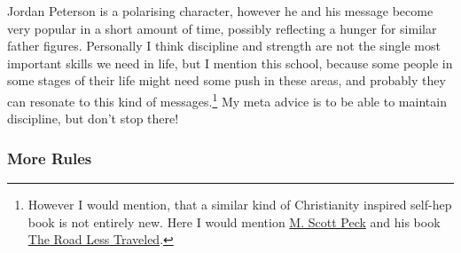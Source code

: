 \documentclass{article}
\begin{document}
\vspace{12pt}

Jordan Peterson is a polarising character, however he and his message become very popular in a short amount of time, possibly reflecting a hunger for similar father figures. Personally I think discipline and strength are not the single most important skills we need in life, but I mention this school, because some people in some stages of their life might need some push in these areas, and probably they can resonate to this kind of messages.\footnote{However I would mention, that a similar kind of Christianity inspired self-hep book is not entirely new. Here I would mention \href{https://en.wikipedia.org/wiki/M._Scott_Peck}{M. Scott Peck} and his book \href{https://www.goodreads.com/book/show/347852.The_Road_Less_Traveled}{The Road Less Traveled}.} 
My meta advice is to be able to maintain discipline, but don't stop there!

\subsubsection{More Rules}
\end{document}
